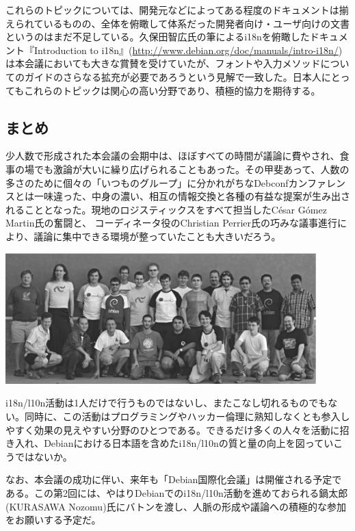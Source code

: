 \documentclass[mingoth,a4paper]{jsarticle}
\begin{document}
これらのトピックについては、開発元などによってある程度のドキュメントは揃えられているものの、全体を俯瞰して体系だった開発者向け・ユーザ向けの文書というのはまだ不足している。久保田智広氏の筆によるi18nを俯瞰したドキュメント『Introduction to i18n』(\url{http://www.debian.org/doc/manuals/intro-i18n/})は本会議においても大きな賞賛を受けていたが、フォントや入力メソッドについてのガイドのさらなる拡充が必要であろうという見解で一致した。日本人にとってもこれらのトピックは関心の高い分野であり、積極的協力を期待する。

\subsection{まとめ}
\label{sec:extremadura-conclusion}

少人数で形成された本会議の会期中は、ほぼすべての時間が議論に費やされ、食事の場でも激論が大いに繰り広げられることもあった。その甲斐あって、人数の多さのために個々の「いつものグループ」に分かれがちなDebconfカンファレンスとは一味違った、中身の濃い、相互の情報交換と各種の有益な提案が生み出されることとなった。現地のロジスティックスをすべて担当したC\'{e}sar G\'{o}mez Martin氏の奮闘と、 コーディネータ役のChristian Perrier氏の巧みな議事進行により、議論に集中できる環境が整っていたことも大きいだろう。

\begin{center}
  \includegraphics[width=12cm]{image200610/full.eps}
\end{center}

i18n/l10n活動は1人だけで行うものではないし、またこなし切れるものでもない。同時に、この活動はプログラミングやハッカー倫理に熟知しなくとも参入しやすく効果の見えやすい分野のひとつである。できるだけ多くの人々を活動に招き入れ、Debianにおける日本語を含めたi18n/l10nの質と量の向上を図っていこうではないか。

なお、本会議の成功に伴い、来年も「Debian国際化会議」は開催される予定である。この第2回には、やはりDebianでのi18n/l10n活動を進めておられる鍋太郎(KURASAWA Nozomu)氏にバトンを渡し、人脈の形成や議論への積極的な参加をお願いする予定だ。
\end{document}
